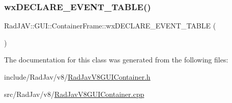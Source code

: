 \subsubsection{\texorpdfstring{wx\+D\+E\+C\+L\+A\+R\+E\+\_\+\+E\+V\+E\+N\+T\+\_\+\+T\+A\+B\+L\+E()}{wxDECLARE\_EVENT\_TABLE()}}
{\footnotesize\ttfamily Rad\+J\+A\+V\+::\+G\+U\+I\+::\+Container\+Frame\+::wx\+D\+E\+C\+L\+A\+R\+E\+\_\+\+E\+V\+E\+N\+T\+\_\+\+T\+A\+B\+LE (\begin{DoxyParamCaption}{ }\end{DoxyParamCaption})\hspace{0.3cm}{\ttfamily [protected]}}



The documentation for this class was generated from the following files\+:\begin{DoxyCompactItemize}
\item 
include/\+Rad\+Jav/v8/\mbox{\hyperlink{_rad_jav_v8_g_u_i_container_8h}{Rad\+Jav\+V8\+G\+U\+I\+Container.\+h}}\item 
src/\+Rad\+Jav/v8/\mbox{\hyperlink{_rad_jav_v8_g_u_i_container_8cpp}{Rad\+Jav\+V8\+G\+U\+I\+Container.\+cpp}}\end{DoxyCompactItemize}
